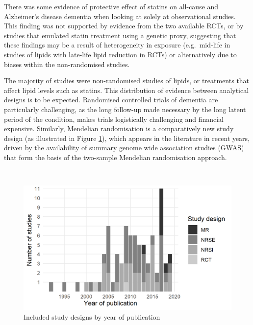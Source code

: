 \documentclass[a4paper, twoside]{templates/ociamthesis}
\begin{document}
There was some evidence of protective effect of statins on all-cause and Alzheimer's disease dementia when looking at solely at observational studies. This finding was not supported by evidence from the two available RCTs, or by studies that emulated statin treatment using a genetic proxy, suggesting that these findings may be a result of heterogeneity in exposure (e.g.~mid-life in studies of lipids with late-life lipid reduction in RCTs) or alternatively due to biases within the non-randomised studies.

The majority of studies were non-randomised studies of lipids, or treatments that affect lipid levels such as statins. This distribution of evidence between analytical designs is to be expected. Randomised controlled trials of dementia are particularly challenging, as the long follow-up made necessary by the long latent period of the condition, makes trials logistically challenging and financial expensive. Similarly, Mendelian randomisation is a comparatively new study design (as illustrated in Figure \ref{fig:typeByYear}), which appears in the literature in recent years, driven by the availability of summary genome wide association studies (GWAS) that form the basis of the two-sample Mendelian randomisation approach.

~





\begin{figure}[H]
\includegraphics[width=1\linewidth]{figures/sys-rev/type_by_year} \caption[Study designs by year of publication]{Included study designs by year of publication}\label{fig:typeByYear}
\end{figure}

~
\end{document}

